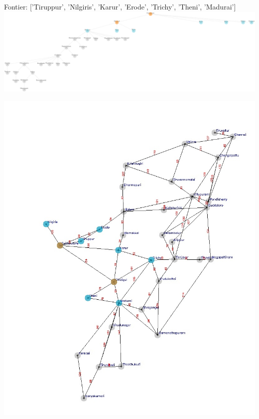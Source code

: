 \documentclass[xcolor=table]{beamer}
\begin{document}
\begin{frame}
  { \tiny Fontier: ['Tiruppur', 'Nilgiris', 'Karur', 'Erode', 'Trichy', 'Theni', 'Madurai'] }
  \includegraphics[width=1\textwidth]{../DFSNodes/4-1.png}
  \begin{center}
    \includegraphics[height=0.5\textheight]{../DFSoutput/tamilDFS2.jpg}
  \end{center}
\end{frame}
\end{document}
